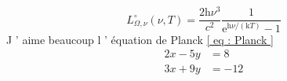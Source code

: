 \begin{equation}
  L _{\Omega ,\nu }^{\circ } (\nu ,T ) =\frac{2\mathrm { h } \nu ^{3}}{
    c ^{2}} \frac{1}{\mathrm { e } ^{\mathrm { h } \nu /(\mathrm { k }
    T ) } -1}
  \label{ eq : Planck } %
\end{equation}
J ’ aime beaucoup l ’ équation de Planck \ref{ eq : Planck }
\begin{align}
2x - 5y &=   8 \\
3x + 9y &=   -12
\end{align}
